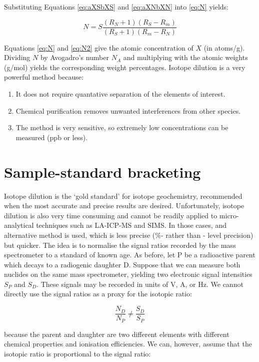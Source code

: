 \documentclass{book}
\begin{document}
Substituting Equations \ref{eq:aXSbXS} and \ref{eq:aXNbXN} into
\ref{eq:N} yields:

\begin{equation}
N = S \frac{(R_N+1)(R_S-R_m)}{(R_S+1)(R_m-R_N)}
\label{eq:N2}
\end{equation}

Equations \ref{eq:N} and \ref{eq:N2} give the atomic concentration of
$X$ (in atoms/g).  Dividing $N$ by Avogadro's number $N_A$ and
multiplying with the atomic weights (g/mol) yields the corresponding
weight percentages. Isotope dilution is a very powerful method
because:

\begin{enumerate}
\item It does not require quantative separation of the elements of
  interest.
\item Chemical purification removes unwanted interferences from other
  species.
\item The method is very sensitive, so extremely low concentrations
  can be measured (ppb or less).
\end{enumerate}

\section{Sample-standard bracketing}
\label{sec:bracketing}

Isotope dilution is the `gold standard' for isotope geochemistry,
recommended when the most accurate and precise results are
desired. Unfortunately, isotope dilution is also very time consuming
and cannot be readily applied to micro-analytical techniques such as
LA-ICP-MS and SIMS. In those cases, and alternative method is used,
which is less precise (\%- rather than \permil- level precision) but
quicker.  The idea is to normalise the signal ratios recorded by the
mass spectrometer to a standard of known age.  As before, let P be a
radioactive parent which decays to a radiogenic daughter D. Suppose
that we can measure both nuclides on the same mass spectrometer,
yielding two electronic signal intensities $S_P$ and $S_D$. These
signals may be recorded in units of V, A, or Hz. We cannot directly
use the signal ratios as a proxy for the isotopic ratio:

$$\frac{N_D}{N_P} \neq \frac{S_D}{S_P}$$

because the parent and daughter are two different elements with
different chemical properties and ionisation efficiencies. We can,
however, assume that the isotopic ratio is proportional to the signal
ratio:
\end{document}
